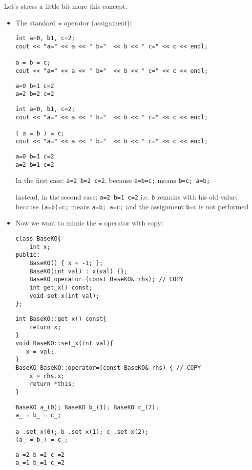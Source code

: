 Let's stress a little bit more this concept.

\begin{itemize}[$\triangleright$]
\item The standard \texttt{=} operator (assignment):
\begin{lstlisting}
int a=0, b1, c=2;
cout << "a=" << a << " b="  << b << " c=" << c << endl;

a = b = c;
cout << "a=" << a << " b="  << b << " c=" << c << endl;
\end{lstlisting}
\begin{lstlisting}[frame=none]
a=0 b=1 c=2
a=2 b=2 c=2
\end{lstlisting}
\begin{lstlisting}
int a=0, b1, c=2;
cout << "a=" << a << " b="  << b << " c=" << c << endl;

( a = b ) = c;
cout << "a=" << a << " b="  << b << " c=" << c << endl;
\end{lstlisting}
\begin{lstlisting}[frame=none]
a=0 b=1 c=2
a=2 b=1 c=2
\end{lstlisting}

In the first case: \lstinline|a=2 b=2 c=2|, because \lstinline|a=b=c;| means \lstinline|b=c; a=b;|

Instead, in the second case: \lstinline|a=2 b=1 c=2| i.e. \texttt{b} remains with his old value, because \lstinline|(a=b)=c;| means \lstinline|a=b; a=c;| and the assignment \lstinline|b=c| is not performed

\newpage

\item Now we want to mimic the \texttt{=} operator with copy:
\begin{lstlisting}
class BaseKO{
    int x;
public:
    BaseKO() { x = -1; };
    BaseKO(int val) : x(val) {};
    BaseKO operator=(const BaseKO& rhs); // COPY
    int get_x() const;
    void set_x(int val);
};   
\end{lstlisting}
\begin{lstlisting}
int BaseKO::get_x() const{
    return x;
}
void BaseKO::set_x(int val){
   x = val;
}
BaseKO BaseKO::operator=(const BaseKO& rhs) { // COPY
    x = rhs.x;
    return *this;
}
\end{lstlisting}
\begin{lstlisting}
BaseKO a_(0); BaseKO b_(1); BaseKO c_(2);
a_ = b_ = c_;

a_.set_x(0); b_.set_x(1); c_.set_x(2);
(a_ = b_) = c_;
\end{lstlisting}
\begin{lstlisting}[frame=none]
a_=2 b_=2 c_=2
a_=1 b_=1 c_=2
\end{lstlisting}


\end{itemize}
